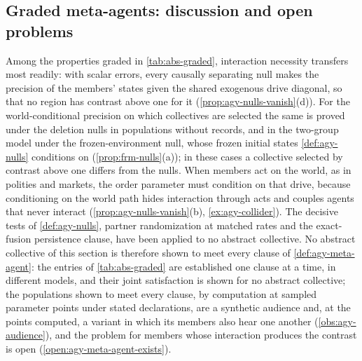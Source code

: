 \subsection{Graded meta-agents: discussion and open problems}\label{sup:abs-graded-meta-agents-discussion-and-open-p}

Among the properties graded in \cref{tab:abs-graded}, interaction necessity transfers most readily: with scalar errors, every causally separating null makes the precision of the members' states given the shared exogenous drive diagonal, so that no region has contrast above one for it (\cref{prop:agy-nulls-vanish}(d)). For the world-conditional precision on which collectives are selected the same is proved under the deletion nulls in populations without records, and in the two-group model under the frozen-environment null, whose frozen initial states \cref{def:agy-nulls} conditions on (\cref{prop:frm-nulls}(a)); in these cases a collective selected by contrast above one differs from the nulls. When members act on the world, as in polities and markets, the order parameter must condition on that drive, because conditioning on the world path hides interaction through acts and couples agents that never interact (\cref{prop:agy-nulls-vanish}(b), \cref{ex:agy-collider}). The decisive tests of \cref{def:agy-nulls}, partner randomization at matched rates and the exact-fusion persistence clause, have been applied to no abstract collective. No abstract collective of this section is therefore shown to meet every clause of \cref{def:agy-meta-agent}: the entries of \cref{tab:abs-graded} are established one clause at a time, in different models, and their joint satisfaction is shown for no abstract collective; the populations shown to meet every clause, by computation at sampled parameter points under stated declarations, are a synthetic audience and, at the points computed, a variant in which its members also hear one another (\cref{obs:agy-audience}), and the problem for members whose interaction produces the contrast is open (\cref{open:agy-meta-agent-exists}).

